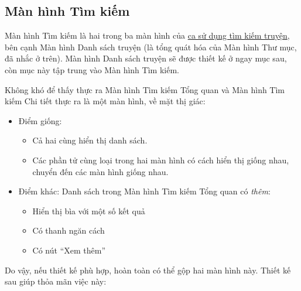\documentclass[../../../../thesis]{subfiles}
\begin{document}

\subsection{Màn hình Tìm kiếm}\label{sec:search-design}

Màn hình Tìm kiếm là hai trong ba màn hình của \hyperref[sec:search-comic]{ca sử
dụng tìm kiếm truyện}, bên cạnh Màn hình Danh sách truyện (là tổng quát hóa của
Màn hình Thư mục, đã nhắc ở trên). Màn hình Danh sách truyện sẽ được thiết kế ở
ngay mục sau, còn mục này tập trung vào Màn hình Tìm kiếm.

Không khó để thấy thực ra Màn hình Tìm kiếm Tổng quan và Màn hình Tìm kiếm Chi
tiết thực ra là một màn hình, về mặt thị giác:

\begin{itemize}
    \item
        Điểm giống:

        \begin{itemize}
            \item
                Cả hai cùng hiển thị danh sách.
            \item
                Các phần tử cùng loại trong hai màn hình có cách hiển thị giống
                nhau, chuyển đến các màn hình giống nhau.
        \end{itemize}
    \item
        Điểm khác: Danh sách trong Màn hình Tìm kiếm Tổng quan có \emph{thêm}:

        \begin{itemize}
            \item
                Hiển thị bìa với một số kết quả
            \item
                Có thanh ngăn cách
            \item
                Có nút ``Xem thêm''
        \end{itemize}
\end{itemize}

Do vậy, nếu thiết kế phù hợp, hoàn toàn có thể gộp hai màn hình này. Thiết kế
sau giúp thỏa mãn việc này:
\end{document}
